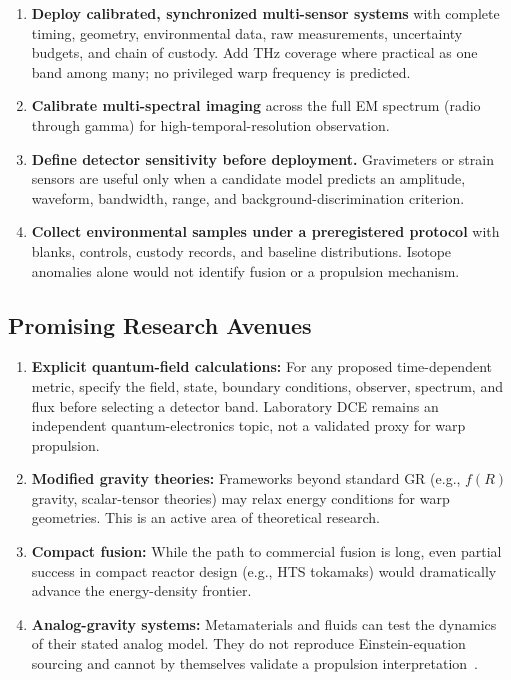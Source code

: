 \documentclass[aps,prd,twocolumn,superscriptaddress,nofootinbib,floatfix]{revtex4-2}
\begin{document}
\begin{enumerate}
  \item \textbf{Deploy calibrated, synchronized multi-sensor systems} with
        complete timing, geometry, environmental data, raw measurements,
        uncertainty budgets, and chain of custody. Add THz coverage where
        practical as one band among many; no privileged warp frequency is
        predicted.
  \item \textbf{Calibrate multi-spectral imaging} across the full EM spectrum
        (radio through gamma) for high-temporal-resolution observation.
  \item \textbf{Define detector sensitivity before deployment.} Gravimeters or
        strain sensors are useful only when a candidate model predicts an
        amplitude, waveform, bandwidth, range, and background-discrimination
        criterion.
  \item \textbf{Collect environmental samples under a preregistered protocol}
        with blanks, controls, custody records, and baseline distributions.
        Isotope anomalies alone would not identify fusion or a propulsion
        mechanism.
\end{enumerate}

\subsection{Promising Research Avenues}\label{sec:avenues}

\begin{enumerate}
  \item \textbf{Explicit quantum-field calculations:} For any proposed
        time-dependent metric, specify the field, state, boundary conditions,
        observer, spectrum, and flux before selecting a detector band. Laboratory
        DCE remains an independent quantum-electronics topic, not a validated
        proxy for warp propulsion.
  \item \textbf{Modified gravity theories:} Frameworks beyond standard GR (e.g.,
        $f(R)$ gravity, scalar-tensor theories) may relax energy conditions for
        warp geometries. This is an active area of theoretical research.
  \item \textbf{Compact fusion:} While the path to commercial fusion is long, even
        partial success in compact reactor design (e.g., HTS tokamaks) would
        dramatically advance the energy-density frontier.
  \item \textbf{Analog-gravity systems:} Metamaterials and fluids can test the
        dynamics of their stated analog model. They do not reproduce
        Einstein-equation sourcing and cannot by themselves validate a propulsion
        interpretation~\cite{Wilson2011,PendrySchurig2006,Lahteenmaki2013,Steinhauer2016}.
\end{enumerate}
\end{document}
